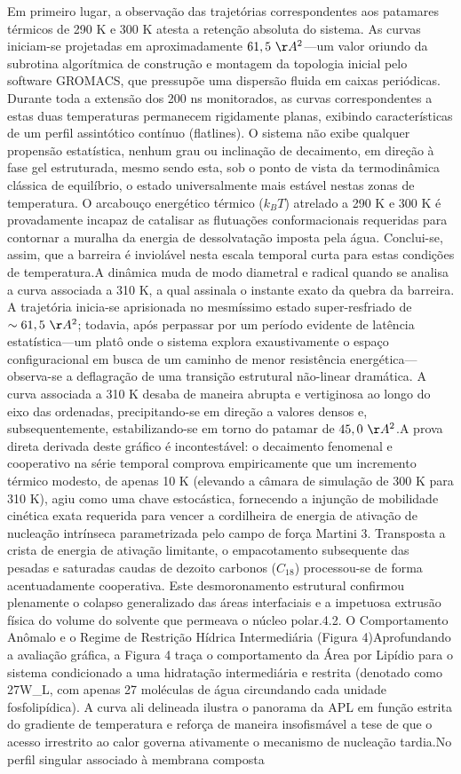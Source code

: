 Em primeiro lugar, a observação das trajetórias correspondentes aos patamares térmicos de 290 K e 300 K atesta a retenção absoluta do sistema. As curvas iniciam-se projetadas em aproximadamente $61,5~\AA^2$—um valor oriundo da subrotina algorítmica de construção e montagem da topologia inicial pelo software GROMACS, que pressupõe uma dispersão fluida em caixas periódicas. Durante toda a extensão dos 200 ns monitorados, as curvas correspondentes a estas duas temperaturas permanecem rigidamente planas, exibindo características de um perfil assintótico contínuo (flatlines). O sistema não exibe qualquer propensão estatística, nenhum grau ou inclinação de decaimento, em direção à fase gel estruturada, mesmo sendo esta, sob o ponto de vista da termodinâmica clássica de equilíbrio, o estado universalmente mais estável nestas zonas de temperatura. O arcabouço energético térmico ($k_B T$) atrelado a 290 K e 300 K é provadamente incapaz de catalisar as flutuações conformacionais requeridas para contornar a muralha da energia de dessolvatação imposta pela água. Conclui-se, assim, que a barreira é inviolável nesta escala temporal curta para estas condições de temperatura.A dinâmica muda de modo diametral e radical quando se analisa a curva associada a 310 K, a qual assinala o instante exato da quebra da barreira. A trajetória inicia-se aprisionada no mesmíssimo estado super-resfriado de $\sim61,5~\AA^2$; todavia, após perpassar por um período evidente de latência estatística—um platô onde o sistema explora exaustivamente o espaço configuracional em busca de um caminho de menor resistência energética—observa-se a deflagração de uma transição estrutural não-linear dramática. A curva associada a 310 K desaba de maneira abrupta e vertiginosa ao longo do eixo das ordenadas, precipitando-se em direção a valores densos e, subsequentemente, estabilizando-se em torno do patamar de $45,0~\AA^2$.A prova direta derivada deste gráfico é incontestável: o decaimento fenomenal e cooperativo na série temporal comprova empiricamente que um incremento térmico modesto, de apenas 10 K (elevando a câmara de simulação de 300 K para 310 K), agiu como uma chave estocástica, fornecendo a injunção de mobilidade cinética exata requerida para vencer a cordilheira de energia de ativação de nucleação intrínseca parametrizada pelo campo de força Martini 3. Transposta a crista de energia de ativação limitante, o empacotamento subsequente das pesadas e saturadas caudas de dezoito carbonos ($C_{18}$) processou-se de forma acentuadamente cooperativa. Este desmoronamento estrutural confirmou plenamente o colapso generalizado das áreas interfaciais e a impetuosa extrusão física do volume do solvente que permeava o núcleo polar.4.2. O Comportamento Anômalo e o Regime de Restrição Hídrica Intermediária (Figura 4)Aprofundando a avaliação gráfica, a Figura 4 traça o comportamento da Área por Lipídio para o sistema condicionado a uma hidratação intermediária e restrita (denotado como 27W\_L, com apenas 27 moléculas de água circundando cada unidade fosfolipídica). A curva ali delineada ilustra o panorama da APL em função estrita do gradiente de temperatura e reforça de maneira insofismável a tese de que o acesso irrestrito ao calor governa ativamente o mecanismo de nucleação tardia.No perfil singular associado à membrana composta 